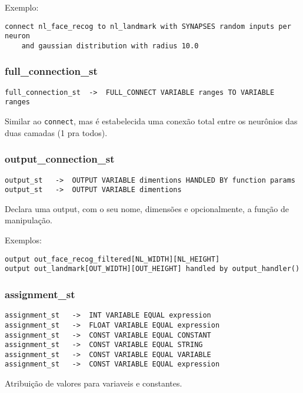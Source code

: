 \documentclass[a4paper,10pt]{article}
\begin{document}
Exemplo:
\begin{lstlisting}
connect nl_face_recog to nl_landmark with SYNAPSES random inputs per neuron
	and gaussian distribution with radius 10.0
\end{lstlisting}
\vspace{10mm}


	\subsubsection{full\_connection\_st}
		\begin{lstlisting}
full_connection_st	->	FULL_CONNECT VARIABLE ranges TO VARIABLE ranges
		\end{lstlisting}
Similar ao \texttt{connect}, mas \'e estabelecida uma conex\~ao total entre os neur\^onios das duas camadas (1 pra todos).

\vspace{10mm}

	\subsubsection{output\_connection\_st}
		\begin{lstlisting}
output_st	->	OUTPUT VARIABLE dimentions HANDLED BY function params
output_st	->	OUTPUT VARIABLE dimentions 
		\end{lstlisting}
Declara uma output, com o seu nome, dimens\~oes e opcionalmente, a fun\c{c}\~ao de manipula\c{c}\~ao.

Exemplos:
\begin{lstlisting}
output out_face_recog_filtered[NL_WIDTH][NL_HEIGHT]
output out_landmark[OUT_WIDTH][OUT_HEIGHT] handled by output_handler()
\end{lstlisting}
\vspace{10mm}


	\subsubsection{assignment\_st}
		\begin{lstlisting}
assignment_st	->	INT VARIABLE EQUAL expression
assignment_st	->	FLOAT VARIABLE EQUAL expression
assignment_st	->	CONST VARIABLE EQUAL CONSTANT
assignment_st	->	CONST VARIABLE EQUAL STRING
assignment_st	->	CONST VARIABLE EQUAL VARIABLE
assignment_st	->	CONST VARIABLE EQUAL expression
		\end{lstlisting}
Atribui\c{c}\~{a}o de valores para variaveis e constantes.
\end{document}
